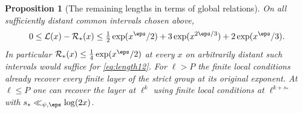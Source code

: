 \documentclass[a4paper,11pt]{article}
\newtheorem{proposition}{Proposition}[section]
\theoremstyle{definition}
\theoremstyle{remark}
\numberwithin{equation}{section}
\begin{document}
\begin{proposition}[The remaining lengths in terms of global relations]\label{prop:minors33}
On all sufficiently distant common intervals chosen above,
\begin{equation}
 0\le\mathcal L(x)-\mathcal R_*(x)
 \le\tfrac12\exp(x^\eps/2)+3\exp(x^{2\eps/3})+2\exp(x^\eps/3).
                                                               \label{eq:minerr33}
\end{equation}
In particular \(\mathcal R_*(x)\le\tfrac14\exp(x^\eps/2)\) at every \(x\) on arbitrarily distant such intervals would suffice for \eqref{eq:length12}. For \(\ell>P\) the finite local conditions already recover every finite layer of the strict group at its original exponent. At \(\ell\le P\) one can recover the layer at \(\ell^k\) using finite local conditions at \(\ell^{k+s_*}\) with \(s_*\ll_{\psi,\eps}\log(2x)\).
\end{proposition}
\end{document}
